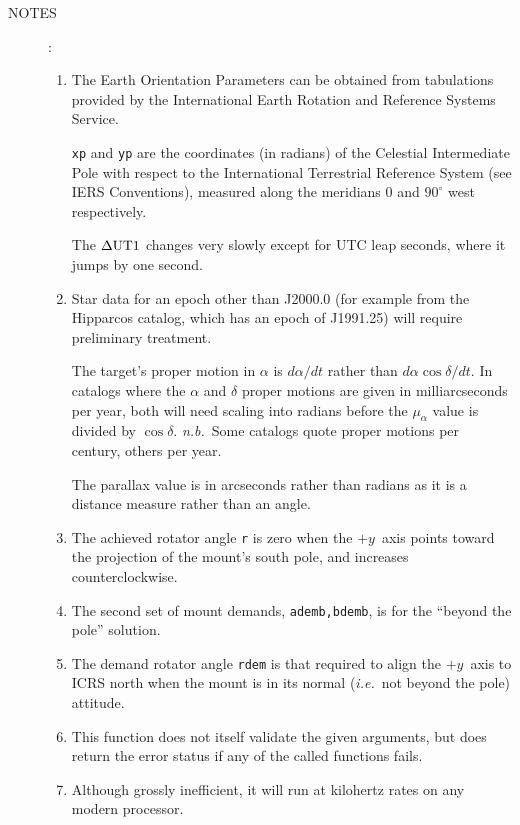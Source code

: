 \documentclass[11pt,fleqn,twoside,\paper]{article}
\renewcommand{\_}{{\tt\char'137}}     %
\newcommand{\degi}[1]   {$#1^{\circ}$}
\newcommand{\notes}[1]
{
  \goodbreak
  \begin{description}
    \item[NOTES]: \nopagebreak
        #1
  \end{description}
  \vspace{-3ex}
}
\begin{document}
\notes{
\begin{enumerate}
\setlength{\parskip}{\medskipamount}
\item The Earth Orientation Parameters can be obtained from tabulations
      provided by the International Earth Rotation and Reference
      Systems Service.

      {\tt xp} and {\tt yp}
      are the coordinates (in radians) of the Celestial
      Intermediate Pole with respect to the International Terrestrial
      Reference System (see IERS Conventions), measured along the
      meridians 0 and \degi{90} west respectively.

      The $\Delta\rm{UT1}$ changes very slowly except for UTC leap
      seconds, where it jumps by one second.

\item Star data for an epoch other than J2000.0 (for example from the
      Hipparcos catalog, which has an epoch of J1991.25) will require
      preliminary treatment.

      The target's proper motion in $\alpha$ is $d\alpha/dt$ rather than
      $d\alpha \cos\delta /dt$.  In catalogs where the $\alpha$ and
      $\delta$ proper motions
      are given in milliarcseconds per year, both will need scaling
      into radians before the $\mu_\alpha$ value is divided by
      $\cos \delta$.  {\it n.b.}~Some catalogs quote proper motions
      per century, others per year.

      The parallax value is in arcseconds rather than radians as it is
      a distance measure rather than an angle.
\item The achieved rotator angle {\tt r} is zero when the $+y$~axis
      points toward the projection of the mount's south pole, and
      increases counterclockwise.
\item The second set of mount demands,
      {\tt ademb,bdemb}, is for the ``beyond the pole'' solution.
\item The demand rotator angle {\tt rdem} is that required to align the
      $+y$~axis to ICRS north when the mount is in its normal
      ({\it i.e.}~not beyond the pole) attitude.
\item This function does not itself validate the given arguments, but
      does return the error status if any of the called functions
      fails.
\item Although grossly inefficient, it will run at kilohertz rates on
      any modern processor.
\end{enumerate}
}
\end{document}

